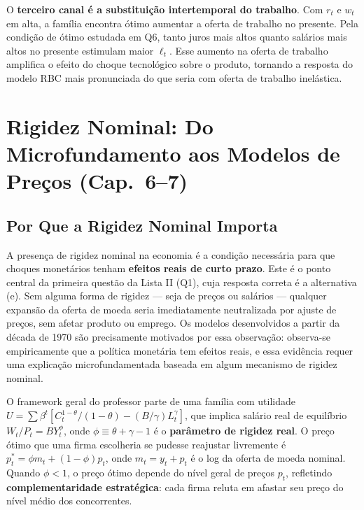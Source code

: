 \documentclass[12pt, a4paper]{article}
\begin{document}
O \textbf{terceiro canal é a substituição intertemporal do trabalho}. Com $r_t$ e $w_t$ em alta, a família encontra ótimo aumentar a oferta de trabalho no presente. Pela condição de ótimo estudada em Q6, tanto juros mais altos quanto salários mais altos no presente estimulam maior $\ell_t$. Esse aumento na oferta de trabalho amplifica o efeito do choque tecnológico sobre o produto, tornando a resposta do modelo RBC mais pronunciada do que seria com oferta de trabalho inelástica.

\section{Rigidez Nominal: Do Microfundamento aos Modelos de Preços (Cap.\ 6--7)}

\subsection{Por Que a Rigidez Nominal Importa}

A presença de rigidez nominal na economia é a condição necessária para que choques monetários tenham \textbf{efeitos reais de curto prazo}. Este é o ponto central da primeira questão da Lista II (Q1), cuja resposta correta é a alternativa (e). Sem alguma forma de rigidez — seja de preços ou salários — qualquer expansão da oferta de moeda seria imediatamente neutralizada por ajuste de preços, sem afetar produto ou emprego. Os modelos desenvolvidos a partir da década de 1970 são precisamente motivados por essa observação: observa-se empiricamente que a política monetária tem efeitos reais, e essa evidência requer uma explicação microfundamentada baseada em algum mecanismo de rigidez nominal.

O framework geral do professor parte de uma família com utilidade $U = \sum \beta^t[C_t^{1-\theta}/(1-\theta) - (B/\gamma)L_t^\gamma]$, que implica salário real de equilíbrio $W_t/P_t = BY_t^\phi$, onde $\phi \equiv \theta + \gamma - 1$ é o \textbf{parâmetro de rigidez real}. O preço ótimo que uma firma escolheria se pudesse reajustar livremente é $p_t^* = \phi m_t + (1-\phi)p_t$, onde $m_t = y_t + p_t$ é o log da oferta de moeda nominal. Quando $\phi < 1$, o preço ótimo depende do nível geral de preços $p_t$, refletindo \textbf{complementaridade estratégica}: cada firma reluta em afastar seu preço do nível médio dos concorrentes.
\end{document}
